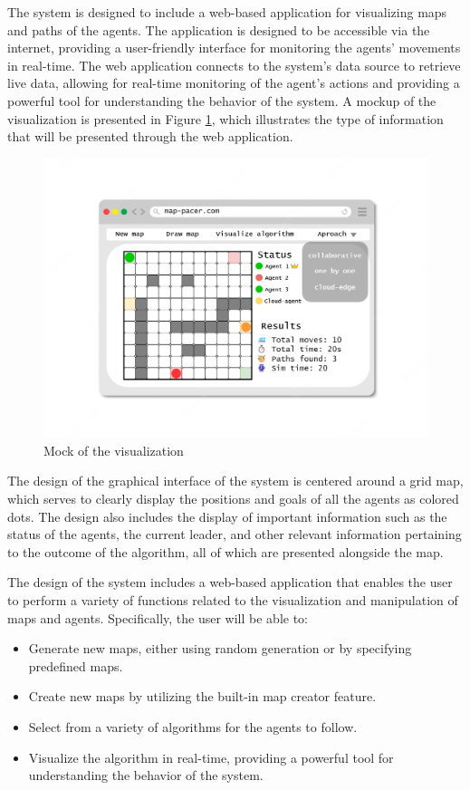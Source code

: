 The system is designed to include a web-based application for visualizing maps and paths of the agents. The application is designed to be accessible via the internet, providing a user-friendly interface for monitoring the agents' movements in real-time. The web application connects to the system's data source to retrieve live data, allowing for real-time monitoring of the agent's actions and providing a powerful tool for understanding the behavior of the system. A mockup of the visualization is presented in Figure \ref{fig:vis_mock}, which illustrates the type of information that will be presented through the web application.

\begin{figure}[H]
    \centering
    \includegraphics[width=\textwidth]{pictures/frontenf_mock.png}
    \caption{Mock of the visualization}
    \label{fig:vis_mock}
\end{figure}

The design of the graphical interface of the system is centered around a grid map, which serves to clearly display the positions and goals of all the agents as colored dots. The design also includes the display of important information such as the status of the agents, the current leader, and other relevant information pertaining to the outcome of the algorithm, all of which are presented alongside the map.

The design of the system includes a web-based application that enables the user to perform a variety of functions related to the visualization and manipulation of maps and agents. Specifically, the user will be able to:

\begin{itemize}
\itemsep0em
\item Generate new maps, either using random generation or by specifying predefined maps.
\item Create new maps by utilizing the built-in map creator feature.
\item Select from a variety of algorithms for the agents to follow.
\item Visualize the algorithm in real-time, providing a powerful tool for understanding the behavior of the system.
\end{itemize}

